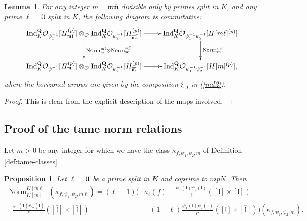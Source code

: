 \documentclass[10pt,letterpaper]{amsart}
\theoremstyle{plain}
\theoremstyle{definition}
\theoremstyle{definition}
\theoremstyle{plain}
\newtheorem{prop}[thm]{Proposition}
\theoremstyle{plain}
\newtheorem{lem}[thm]{Lemma}
\theoremstyle{plain}
\theoremstyle{remark}
\numberwithin{equation}{section}
\newcommand{\fkm}{\mathfrak{m}}
\newcommand{\fkmbar}{\overline{\mathfrak{m}}}
\newcommand{\fkl}{\mathfrak{l}}
\newcommand{\fklbar}{\overline{\mathfrak{l}}}
\DeclareMathOperator{\Norm}{\mathrm{Norm}}
\newcommand{\Q}{\mathbf{Q}}
\begin{document}
\begin{lem}\label{keydiagram}
For any integer $m=\fkm\fkmbar$ divisible only by primes split in $K$, and any prime $\ell=\fkl\fklbar$ split in $K$, the following diagram is commutative:
\[
\xymatrix{
 {\mathrm{Ind}}^{\Q}_{K}\mathcal{O}_{\psi_{1}^{-1}}[H_{\fkm\fkl}^{(p)}]\otimes_{\mathcal{O}}{\mathrm{Ind}}^{\Q}_{K}\mathcal{O}_{\psi_{2}^{-1}}[H_{\fkmbar\fklbar}^{(p)}] \ar[d]^{\mathrm{Norm}^{\fkm\fkl}_{\fkm}\otimes\mathrm{Norm}^{\fkmbar\fklbar}_{\fkmbar}} \ar[r] &{\mathrm{Ind}}^{\Q}_{K}\mathcal{O}_{\psi_{1}^{-1}\psi_{2}^{-1}}[H[m\ell]^{(p)}] \ar[d]^{\mathrm{Norm}^{m\ell}_{m}} \\
{\mathrm{Ind}}^{\Q}_{K}\mathcal{O}_{\psi_{1}^{-1}}[H_{\fkm}^{(p)}]\otimes_{\mathcal{O}}{\mathrm{Ind}}^{\Q}_{K}\mathcal{O}_{\psi_{2}^{-1}}[H_{\fkmbar}^{(p)}] \ar[r] & {\mathrm{Ind}}^{\Q}_{K}\mathcal{O}_{\psi_{1}^{-1}\psi_{2}^{-1}}[H[m]^{(p)}],}
\]
where the horizonal arrows are given by the composition $\xi_\Delta$ in  (\ref{ind2}).
\end{lem}

\begin{proof}
This is clear from the explicit description of the maps involved.
\end{proof}


\subsection{Proof of the tame norm relations}

Let $m>0$ be any integer for which we have the class $\tilde{\kappa}_{f,\psi_1,\psi_2,m}$ of Definition \ref{def:tame-classes}. 





\begin{prop}\label{wrongnorm}
Let $\ell=\fkl\fklbar$ be a prime split in $K$ and coprime to $mpN$. Then
\begin{align*}
\Norm_{K[m]}^{K[m\ell]}(\tilde{\kappa}_{f,\psi_1,\psi_2,m\ell})=(\ell-1)\bigg(&a_\ell(f)-\frac{\psi_1(\fkl)\psi_2(\fkl)}{\ell}([\fkl]\times [\fkl])\\-\frac{\psi_1(\fklbar)\psi_2(\fklbar)}{\ell}([\fklbar]\times [\fklbar])
   &+(1-\ell)\frac{\psi_1(\fkl)\psi_2(\fklbar)}{\ell^2}([\fkl]\times[\fklbar])\bigg)
    (\tilde{\kappa}_{f,\psi_1,\psi_2,m}).
\end{align*}
\end{prop}
\end{document}
